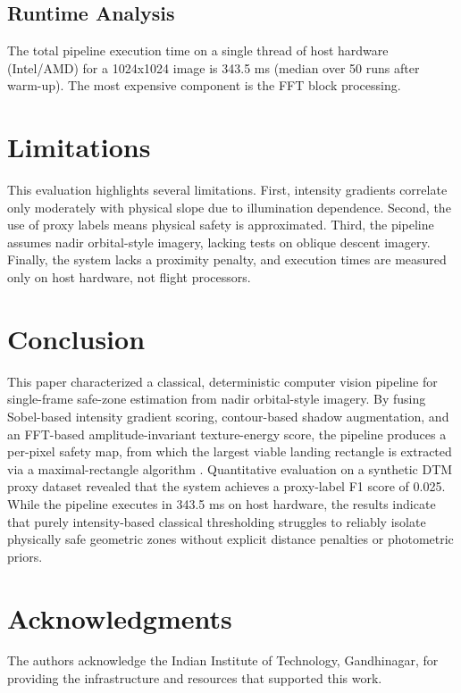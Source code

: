 \documentclass{article}
\begin{document}
\subsection{Runtime Analysis}
The total pipeline execution time on a single thread of host hardware (Intel/AMD) for a 1024x1024 image is 343.5 ms (median over 50 runs after warm-up). The most expensive component is the FFT block processing.


\section{Limitations}
This evaluation highlights several limitations. First, intensity gradients correlate only moderately with physical slope due to illumination dependence. Second, the use of proxy labels means physical safety is approximated. Third, the pipeline assumes nadir orbital-style imagery, lacking tests on oblique descent imagery. Finally, the system lacks a proximity penalty, and execution times are measured only on host hardware, not flight processors.

\section{Conclusion}
This paper characterized a classical, deterministic computer vision pipeline for single-frame safe-zone estimation from nadir orbital-style imagery. By fusing Sobel-based intensity gradient scoring, contour-based shadow augmentation, and an FFT-based amplitude-invariant texture-energy score, the pipeline produces a per-pixel safety map, from which the largest viable landing rectangle is extracted via a maximal-rectangle algorithm \cite{vandevoorde1996maximal}. Quantitative evaluation on a synthetic DTM proxy dataset revealed that the system achieves a proxy-label F1 score of 0.025. While the pipeline executes in 343.5 ms on host hardware, the results indicate that purely intensity-based classical thresholding struggles to reliably isolate physically safe geometric zones without explicit distance penalties or photometric priors.

\section*{Acknowledgments}

The authors acknowledge the Indian Institute of Technology, Gandhinagar, for providing the infrastructure and resources that supported this work.

  
  
\end{document}
